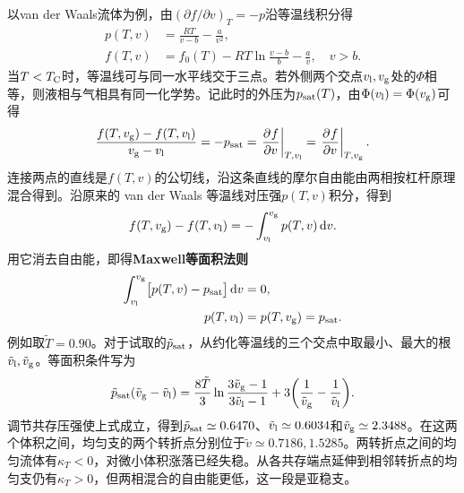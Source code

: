 以van der Waals流体为例，由$(\partial f/\partial v)_T = -p$沿等温线积分得
\begin{align*}
	p(T,v) &= \frac{RT}{v - b} - \frac a{v^2},\\
	f(T,v) &= f_0(T) - RT\ln\frac{v - b}{b} - \frac av,\quad v > b .
\end{align*}
当$T < T_\mathrm C$时，等温线可与同一水平线交于三点。若外侧两个交点$v_\mathrm l,v_\mathrm g$处的$\Phi$相等，则液相与气相具有同一化学势。记此时的外压为$p_{\rm sat}(T)$，由$\Phi(v_\mathrm l) = \Phi(v_\mathrm g)$可得
\begin{equation}
	\label{eq:sm-common-tangent}
	\frac{f(T,v_\mathrm g) - f(T,v_\mathrm l)}{v_\mathrm g - v_\mathrm l}
	= -p_{\rm sat}
	= \left.\frac{\partial^{}f}{\partial{v}^{}}\right|_{T,v_\mathrm l}
	= \left.\frac{\partial^{}f}{\partial{v}^{}}\right|_{T,v_\mathrm g}.
\end{equation}
连接两点的直线是$f(T,v)$的公切线，沿这条直线的摩尔自由能由两相按杠杆原理混合得到。沿原来的 van der Waals 等温线对压强$p(T,v)$积分，得到
\[
	f(T,v_\mathrm g) - f(T,v_\mathrm l) = -\int_{v_\mathrm l}^{v_\mathrm g}p(T,v)\mathop{}\!\mathrm{d} v.
\]
用它消去自由能，即得\textbf{Maxwell等面积法则}
\begin{subequations}
	\begin{align}
		\int_{v_\mathrm l}^{v_\mathrm g}\bigl[p(T,v) - p_{\rm sat}\bigr]\mathop{}\!\mathrm{d} v &= 0,\\
		p(T,v_\mathrm l) &= p(T,v_\mathrm g) = p_{\rm sat}.
	\end{align}
\end{subequations}
例如取$\tilde T = 0.90$。对于试取的$\tilde p_{\rm sat}$，从约化等温线的三个交点中取最小、最大的根$\tilde v_\mathrm l,\tilde v_\mathrm g$。等面积条件写为
\[
	\tilde p_{\rm sat}(\tilde v_\mathrm g - \tilde v_\mathrm l)
	= \frac{8\tilde T}{3}\ln\frac{3\tilde v_\mathrm g - 1}{3\tilde v_\mathrm l - 1}
	+ 3\biggl(\frac1{\tilde v_\mathrm g} - \frac1{\tilde v_\mathrm l}\biggr) .
\]
调节共存压强使上式成立，得到$\tilde p_{\rm sat} \simeq 0.6470$、$\tilde v_\mathrm l \simeq 0.6034$和$\tilde v_\mathrm g \simeq 2.3488$。在这两个体积之间，均匀支的两个转折点分别位于$\tilde v \simeq 0.7186,1.5285$。两转折点之间的均匀流体有$\kappa_T < 0$，对微小体积涨落已经失稳。从各共存端点延伸到相邻转折点的均匀支仍有$\kappa_T > 0$，但两相混合的自由能更低，这一段是亚稳支。

\begin{notecaptionblock}
	\label{fig:model of liquid-gas phase transition}
\end{notecaptionblock}

